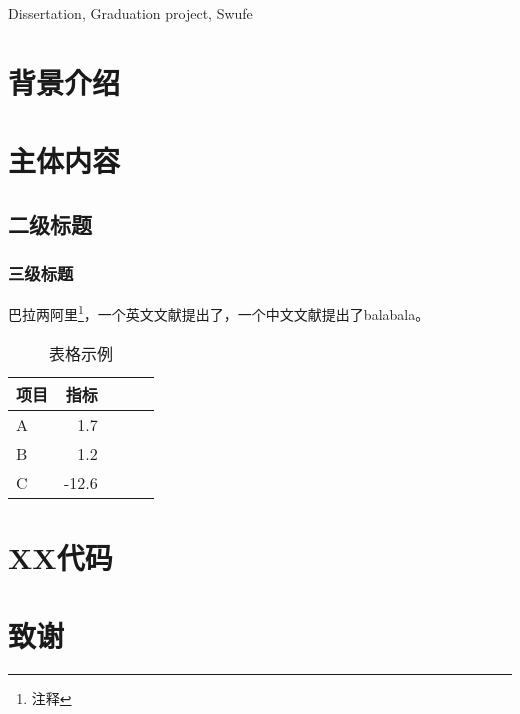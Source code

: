 \documentclass{swufethesis}
\begin{document}
\maketitle %
\statement %
\begin{abstract}{毕业论文, 毕业设计, 西南财经大学}
  \zhlipsum[1]
\end{abstract}

\begin{abstract*}{Dissertation, Graduation project, Swufe}
  \lipsum[1]
\end{abstract*}


\newpage
\setcounter{page}{1}
\tableofcontents
\newpage

\setcounter{page}{1}
\chapter{背景介绍}
\zhlipsum
\chapter{主体内容}

\section{二级标题}
\subsection{三级标题}
\zhlipsum[2-5]
巴拉两阿里\footnote{注释}，一个英文文献\cite{dirac}提出了，一个中文文献\cite{蔡敏2006--}提出了balabala。

\zhlipsum

\begin{table}[htb]
  \caption{表格示例}
  \centering
  \begin{tabular}{lrrrr}
    \toprule
    项目 & 指标  \\
    \midrule
    A    & 1.7   \\
    B    & 1.2   \\
    C    & -12.6 \\
    \bottomrule
  \end{tabular}
\end{table}

\printbibliography
\appendix
\chapter{XX代码}
\newpage
\chapter{致谢}
\end{document}
